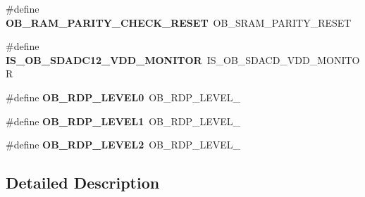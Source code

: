 \begin{DoxyCompactItemize}
\item 
\hypertarget{group___h_a_l___f_l_a_s_h___aliased___defines_gab425a7c5a822ef819107a93463361bd9}{\#define {\bfseries O\-B\-\_\-\-R\-A\-M\-\_\-\-P\-A\-R\-I\-T\-Y\-\_\-\-C\-H\-E\-C\-K\-\_\-\-R\-E\-S\-E\-T}~O\-B\-\_\-\-S\-R\-A\-M\-\_\-\-P\-A\-R\-I\-T\-Y\-\_\-\-R\-E\-S\-E\-T}\label{group___h_a_l___f_l_a_s_h___aliased___defines_gab425a7c5a822ef819107a93463361bd9}

\item 
\hypertarget{group___h_a_l___f_l_a_s_h___aliased___defines_gafc1560626d243a2c9fbd72dbb65c8941}{\#define {\bfseries I\-S\-\_\-\-O\-B\-\_\-\-S\-D\-A\-D\-C12\-\_\-\-V\-D\-D\-\_\-\-M\-O\-N\-I\-T\-O\-R}~I\-S\-\_\-\-O\-B\-\_\-\-S\-D\-A\-C\-D\-\_\-\-V\-D\-D\-\_\-\-M\-O\-N\-I\-T\-O\-R}\label{group___h_a_l___f_l_a_s_h___aliased___defines_gafc1560626d243a2c9fbd72dbb65c8941}

\item 
\hypertarget{group___h_a_l___f_l_a_s_h___aliased___defines_ga7339a05119a474a7bde67e9e500d38cb}{\#define {\bfseries O\-B\-\_\-\-R\-D\-P\-\_\-\-L\-E\-V\-E\-L0}~O\-B\-\_\-\-R\-D\-P\-\_\-\-L\-E\-V\-E\-L\-\_}\label{group___h_a_l___f_l_a_s_h___aliased___defines_ga7339a05119a474a7bde67e9e500d38cb}

\item 
\hypertarget{group___h_a_l___f_l_a_s_h___aliased___defines_ga7291ec039ae68ee1471af8ef3310d326}{\#define {\bfseries O\-B\-\_\-\-R\-D\-P\-\_\-\-L\-E\-V\-E\-L1}~O\-B\-\_\-\-R\-D\-P\-\_\-\-L\-E\-V\-E\-L\-\_}\label{group___h_a_l___f_l_a_s_h___aliased___defines_ga7291ec039ae68ee1471af8ef3310d326}

\item 
\hypertarget{group___h_a_l___f_l_a_s_h___aliased___defines_gae591fa55ccad5cc27b322a5fba9d6ca1}{\#define {\bfseries O\-B\-\_\-\-R\-D\-P\-\_\-\-L\-E\-V\-E\-L2}~O\-B\-\_\-\-R\-D\-P\-\_\-\-L\-E\-V\-E\-L\-\_}\label{group___h_a_l___f_l_a_s_h___aliased___defines_gae591fa55ccad5cc27b322a5fba9d6ca1}

\end{DoxyCompactItemize}


\subsection{Detailed Description}
